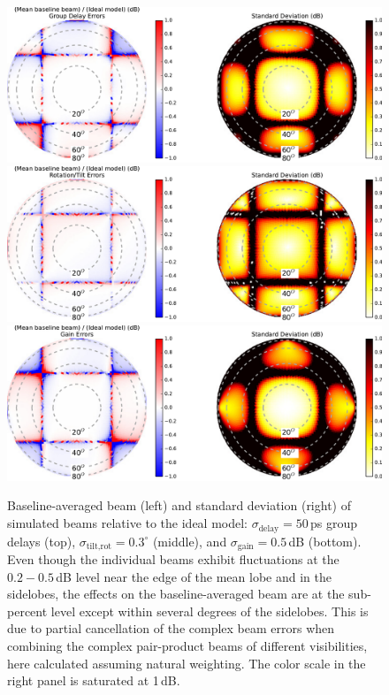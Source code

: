 \begin{figure}[h]
\centering
\includegraphics[width=5in]{chap2_beamforming_errors/groupdelays50ps_baselinemean_and_std_power_beamzenith-eps-converted-to.pdf}
\includegraphics[width=5in]{chap2_beamforming_errors/thetaall0_3deg_baselinemean_and_std_power_beamzenith-eps-converted-to.pdf}
\includegraphics[width=5in]{chap2_beamforming_errors/gains0_5dB_baselinemean_and_std_power_beamzenith-eps-converted-to.pdf}
\caption[Baseline-averaged beam (left) and standard deviation (right) of simulated beams relative to the ideal model.]{Baseline-averaged beam (left) and standard deviation (right) of simulated beams relative to the ideal model: $\sigma_\text{delay}=50$\,ps group delays (top), $\sigma_\text{tilt,rot}=0.3^\circ$ (middle), and $\sigma_\text{gain}=0.5$\,dB (bottom). Even though the individual beams exhibit fluctuations at the $0.2-0.5$\,dB level near the edge of the mean lobe and in the sidelobes, the effects on the baseline-averaged beam are at the sub-percent level except within several degrees of the sidelobes. This is due to partial cancellation of the complex beam errors when combining the complex pair-product beams of different visibilities, here calculated assuming natural weighting. The color scale in the right panel is saturated at 1\,dB.}
\label{fig:simdelaysthetagains}
\end{figure}

